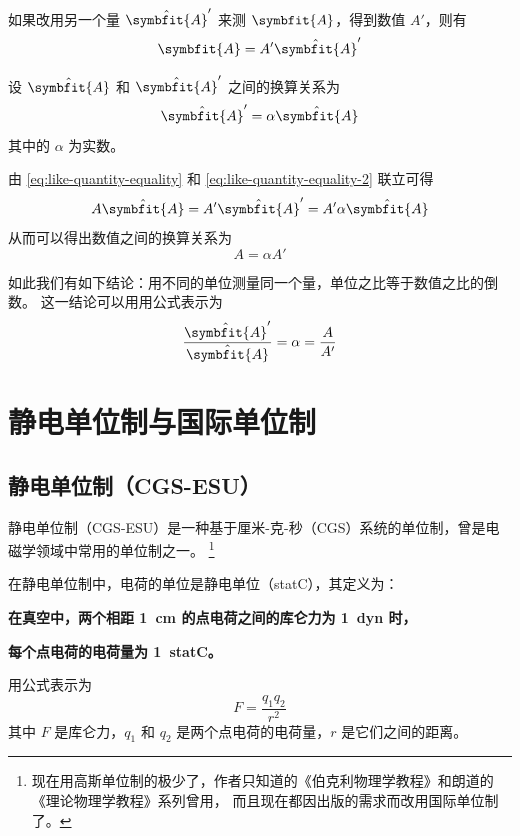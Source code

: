 \documentclass[12pt,a4paper,UTF8,fontset=lxgw]{ctexart}
\begin{document}
如果改用另一个量 $\hat{\symbfit{A}}'$ 来测 $\symbfit{A}$，得到数值 $A'$，则有
\begin{equation}
    \symbfit{A} = A' \hat{\symbfit{A}}'
    \label{eq:like-quantity-equality-2}
\end{equation}

设 $\hat{\symbfit{A}}$ 和 $\hat{\symbfit{A}}'$ 之间的换算关系为
\begin{equation}
    \hat{\symbfit{A}}' = \alpha \hat{\symbfit{A}}
\end{equation}
其中的 $\alpha$ 为实数。

由 \cref{eq:like-quantity-equality} 和 \cref{eq:like-quantity-equality-2} 联立可得
\begin{equation}
    A \hat{\symbfit{A}} = A' \hat{\symbfit{A}}' = A' \alpha \hat{\symbfit{A}}
\end{equation}
从而可以得出数值之间的换算关系为
\begin{equation}
    A = \alpha A'
\end{equation}

如此我们有如下结论：用不同的单位测量同一个量，单位之比等于数值之比的倒数。
这一结论可以用用公式表示为
\begin{equation}
    \frac{\hat{\symbfit{A}}'}{\hat{\symbfit{A}}} = \alpha = \frac{A}{A'}
    \label{eq:unit-conversion}
\end{equation}

\section{静电单位制与国际单位制}

\subsection{静电单位制（CGS-ESU）}
静电单位制（CGS-ESU）是一种基于厘米-克-秒（CGS）系统的单位制，曾是电磁学领域中常用的单位制之一。
\footnote{现在用高斯单位制的极少了，作者只知道的《伯克利物理学教程》和朗道的《理论物理学教程》系列曾用，
    而且现在都因出版的需求而改用国际单位制了。}

在静电单位制中，电荷的单位是静电单位（statC），其定义为：
\begin{center}
    \textbf{在真空中，两个相距 \qty{1}{cm} 的点电荷之间的库仑力为 \qty{1}{dyn} 时，}

    \textbf{每个点电荷的电荷量为 \qty{1}{statC}。}
\end{center}
用公式表示为
\begin{equation}
    F = \frac{q_1 q_2}{r^2}
\end{equation}
其中 $F$ 是库仑力，$q_1$ 和 $q_2$ 是两个点电荷的电荷量，$r$ 是它们之间的距离。
\end{document}
